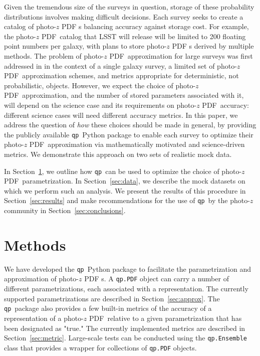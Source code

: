 \documentclass[\docopts]{\docclass}
\newcommand{\qp}{\texttt{qp}\xspace}
\newcommand{\pz}{photo-$z$ PDF\xspace}
\begin{document}
Given the tremendous size of the surveys in question, storage of these 
probability distributions involves making difficult decisions.
Each survey seeks to create a catalog of \pz s balancing accuracy against 
storage cost.
For example, the \pz\ catalog that LSST will release will be limited to 200 
floating point numbers per galaxy, with plans to store \pz s derived by 
multiple methods.  \citep{juric_data_2017}
The problem of \pz\ approximation for large surveys was first addressed in 
\citet{carrasco_kind_sparse_2014} in the context of a single galaxy survey, a 
limited set of \pz\ approximation schemes, and metrics appropriate for 
deterministic, not probabilistic, objects.
However, we expect the choice of \pz\ approximation, and the number of stored 
parameters associated with it, will depend on the science case and its 
requirements on \pz\ accuracy: different science cases will need different 
accuracy metrics.
In this paper, we address the question of \textit{how} these choices should be 
made in general, by providing the publicly available \qp\ Python package to 
enable each survey to optimize their \pz\ approximation via mathematically 
motivated and science-driven metrics.
We demonstrate this approach on two sets of realistic mock data.

In Section~\ref{sec:methods}, we outline how \qp\ can be used to optimize the 
choice of \pz\ parametrization.
In Section~\ref{sec:data}, we describe the mock datasets on which we perform 
such an analysis.
We present the results of this procedure in Section~\ref{sec:results} and make 
recommendations for the use of \qp\ by the photo-$z$ community in 
Section~\ref{sec:conclusions}.








\section{Methods}
\label{sec:methods}



We have developed the \qp\ Python package to facilitate the parametrization and 
approximation of \pz s.
A \texttt{qp.PDF} object can carry a number of different parametrizations, each 
associated with a representation.
The currently supported parametrizations are described in 
Section~\ref{sec:approx}.
The \qp\ package also provides a few built-in metrics of the accuracy of a 
representation of a \pz\ relative to a given parametrization that has been 
designated as "true."
The currently implemented metrics are described in Section~\ref{sec:metric}.
Large-scale tests can be conducted using the \texttt{qp.Ensemble} class that 
provides a wrapper for collections of \texttt{qp.PDF} objects.
\end{document}
